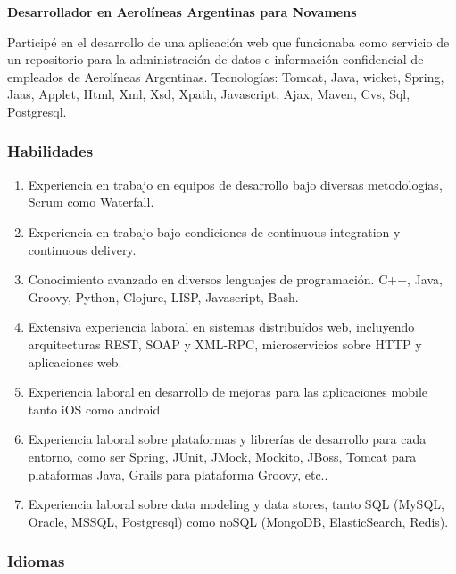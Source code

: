 \documentclass[a4paper,11pt]{article}
\begin{document}
\noindent \textbf{Desarrollador en Aerolíneas Argentinas para Novamens}

\noindent Participé en el desarrollo de una aplicación web que funcionaba como
servicio de un repositorio para la administración de datos e información
confidencial de empleados de Aerolíneas Argentinas.  Tecnologías: Tomcat, Java,
wicket, Spring, Jaas, Applet, Html, Xml, Xsd, Xpath, Javascript, Ajax, Maven,
Cvs, Sql, Postgresql. \\

\subsubsection{Habilidades}

\begin{enumerate}

  \item Experiencia en trabajo en equipos de desarrollo bajo diversas
    metodologías, Scrum como Waterfall.

  \item Experiencia en trabajo bajo condiciones de continuous integration y
    continuous delivery.

  \item Conocimiento avanzado en diversos lenguajes de programación. C++,
    Java, Groovy, Python, Clojure, LISP, Javascript, Bash.

  \item Extensiva experiencia laboral en sistemas distribuídos web, incluyendo
    arquitecturas REST, SOAP y XML-RPC, microservicios sobre HTTP y
    aplicaciones web.

  \item Experiencia laboral en desarrollo de mejoras para las aplicaciones
    mobile tanto iOS como android

  \item Experiencia laboral sobre plataformas y librerías de desarrollo para
    cada entorno, como ser Spring, JUnit, JMock, Mockito, JBoss, Tomcat para
    plataformas Java, Grails para plataforma Groovy, etc..

  \item Experiencia laboral sobre data modeling y data stores, tanto SQL
    (MySQL, Oracle, MSSQL, Postgresql) como noSQL (MongoDB, ElasticSearch,
    Redis).

\end{enumerate}

\subsubsection{Idiomas}
\end{document}
